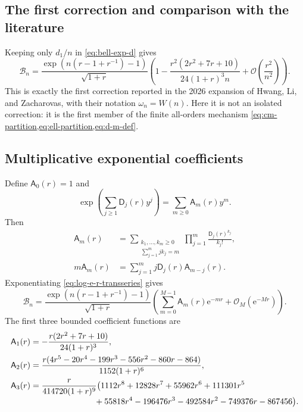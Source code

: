 \documentclass[11pt,a4paper]{article}
\theoremstyle{definition}
\theoremstyle{remark}
\newcommand{\Bell}{\mathcal B}
\newcommand{\ee}{\mathrm e}
\newcommand{\BigO}{\mathcal O}
\newcommand{\cA}{\mathsf A}
\newcommand{\cD}{\mathsf D}
\begin{document}
\subsection{The first correction and comparison with the literature}

Keeping only \(d_1/n\) in \cref{eq:bell-exp-d} gives
\begin{equation}\label{eq:first-literature-correction}
 \boxed{
 \Bell_n=
 \frac{\exp\!\left(n(r-1+r^{-1})-1\right)}{\sqrt{1+r}}
 \left(
  1-
  \frac{r^2(2r^2+7r+10)}{24(1+r)^3n}
  +\BigO\!\left(\frac{r^2}{n^2}\right)
 \right).}
\end{equation}
This is exactly the first correction reported in the 2026 expansion of Hwang,
Li, and Zacharovas, with their notation \(\omega_n=W(n)\).  Here it is not an
isolated correction: it is the first member of the finite all-orders mechanism
\cref{eq:cm-partition,eq:ell-partition,eq:d-m-def}.

\subsection{Multiplicative exponential coefficients}

Define \(\cA_0(r)=1\) and
\begin{equation}\label{eq:A-generating}
 \exp\!\left(\sum_{j\ge1}\cD_j(r)y^j\right)
 =\sum_{m\ge0}\cA_m(r)y^m.
\end{equation}
Then
\begin{align}
 \cA_m(r)
 &=\sum_{\substack{k_1,\ldots,k_m\ge0\\
                    \sum_{j=1}^mjk_j=m}}
   \prod_{j=1}^m\frac{\cD_j(r)^{k_j}}{k_j!},
 \label{eq:A-partition}\\
 m\cA_m(r)
 &=\sum_{j=1}^m j\cD_j(r)\cA_{m-j}(r).
 \label{eq:A-recurrence}
\end{align}
Exponentiating \cref{eq:log-e-r-transseries} gives
\begin{equation}\label{eq:multiplicative-e-r}
 \boxed{
 \Bell_n=
 \frac{\exp\!\left(n(r-1+r^{-1})-1\right)}{\sqrt{1+r}}
 \left(
   \sum_{m=0}^{M-1}\cA_m(r)\ee^{-mr}
   +\BigO_M(\ee^{-Mr})
 \right).}
\end{equation}
The first three bounded coefficient functions are
\begin{align}
 \cA_1(r)
 &=-\frac{r(2r^2+7r+10)}{24(1+r)^3},
 \label{eq:A1}\\
 \cA_2(r)
 &=\frac{r(4r^5-20r^4-199r^3-556r^2-860r-864)}
 {1152(1+r)^6},
 \label{eq:A2}\\
 \cA_3(r)
 &=\frac{r}{414720(1+r)^9}
 \bigl(1112r^8+12828r^7+55962r^6+111301r^5
 \notag\\[-1mm]
 &\hspace{27mm}{}+55818r^4-196476r^3-492584r^2
 -749376r-867456\bigr).
 \label{eq:A3}
\end{align}
\end{document}
